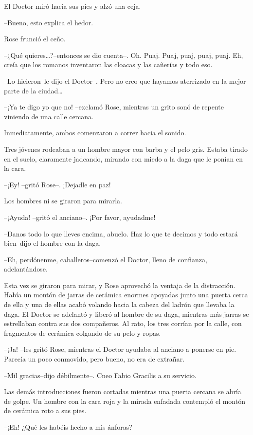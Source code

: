 El Doctor miró hacia sus pies y alzó una ceja.

--Bueno, esto explica el hedor.

Rose frunció el ceño.

--¿Qué quieres\ldots{}?--entonces se dio cuenta--. Oh. Puaj. Puaj, puaj,
puaj, puaj. Eh, creía que los romanos inventaron las cloacas y las
cañerías y todo eso.

--Lo hicieron--le dijo el Doctor--. Pero no creo que hayamos aterrizado
en la mejor parte de la ciudad\ldots{}

--¡Ya te digo yo que no! --exclamó Rose, mientras un grito sonó de
repente viniendo de una calle cercana.

Inmediatamente, ambos comenzaron a correr hacia el sonido.

Tres jóvenes rodeaban a un hombre mayor con barba y el pelo gris. Estaba
tirado en el suelo, claramente jadeando, mirando con miedo a la daga que
le ponían en la cara.

--¡Ey! --gritó Rose--. ¡Dejadle en paz!

Los hombres ni se giraron para mirarla.

--¡Ayuda! --gritó el anciano--. ¡Por favor, ayudadme!

--Danos todo lo que lleves encima, abuelo. Haz lo que te decimos y todo
estará bien--dijo el hombre con la daga.

--Eh, perdónenme, caballeros--comenzó el Doctor, lleno de confianza,
adelantándose.

Esta vez se giraron para mirar, y Rose aprovechó la ventaja de la
distracción. Había un montón de jarras de cerámica enormes apoyadas
junto una puerta cerca de ella y una de ellas acabó volando hacia la
cabeza del ladrón que llevaba la daga. El Doctor se adelantó y liberó al
hombre de su daga, mientras más jarras se estrellaban contra sus dos
compañeros. Al rato, los tres corrían por la calle, con fragmentos de
cerámica colgando de su pelo y ropas.

--¡Ja! --les gritó Rose, mientras el Doctor ayudaba al anciano a ponerse
en pie. Parecía un poco conmovido, pero bueno, no era de extrañar.

--Mil gracias--dijo débilmente--. Cneo Fabio Gracilis a su servicio.

Las demás introducciones fueron cortadas mientras una puerta cercana se
abría de golpe. Un hombre con la cara roja y la mirada enfadada
contempló el montón de cerámica roto a sus pies.

--¡Eh! ¿Qué les habéis hecho a mis ánforas?

